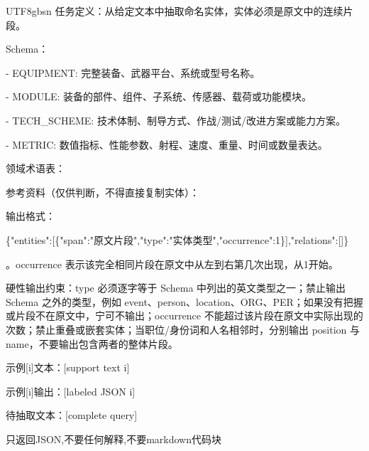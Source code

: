 \begin{CJK*}{UTF8}{gbsn}
\small
\noindent 任务定义：从给定文本中抽取命名实体，实体必须是原文中的连续片段。\par\medskip
\noindent Schema：\par
\noindent - EQUIPMENT: 完整装备、武器平台、系统或型号名称。\par
\noindent - MODULE: 装备的部件、组件、子系统、传感器、载荷或功能模块。\par
\noindent - TECH\_SCHEME: 技术体制、制导方式、作战/测试/改进方案或能力方案。\par
\noindent - METRIC: 数值指标、性能参数、射程、速度、重量、时间或数量表达。\par\medskip
\noindent 领域术语表：\par
{}\par\medskip
\noindent 参考资料（仅供判断，不得直接复制实体）：\par
{}\par\medskip
\noindent 输出格式：\par
\noindent \{"entities":[\{"span":"原文片段","type":"实体类型","occurrence":1\}],"relations":[]\}\par
\noindent 。occurrence 表示该完全相同片段在原文中从左到右第几次出现，从1开始。\par\medskip
\noindent 硬性输出约束：\allowbreak{}type 必须逐字等于 Schema 中列出的英文类型之一；\allowbreak{}禁止输出 Schema 之外的类型，\allowbreak{}例如 event、\allowbreak{}person、\allowbreak{}location、\allowbreak{}ORG、\allowbreak{}PER；\allowbreak{}如果没有把握或片段不在原文中，\allowbreak{}宁可不输出；\allowbreak{}occurrence 不能超过该片段在原文中实际出现的次数；\allowbreak{}禁止重叠或嵌套实体；\allowbreak{}当职位/身份词和人名相邻时，\allowbreak{}分别输出 position 与 name，\allowbreak{}不要输出包含两者的整体片段。\par\medskip
\noindent 示例[i]文本：[support text i]\par
\noindent 示例[i]输出：[labeled JSON i]\par
\noindent [repeat for each selected demonstration; omit when K=0]\par\medskip
\noindent 待抽取文本：[complete query]\par\medskip
\noindent 只返回JSON,不要任何解释,不要markdown代码块\par
\end{CJK*}
